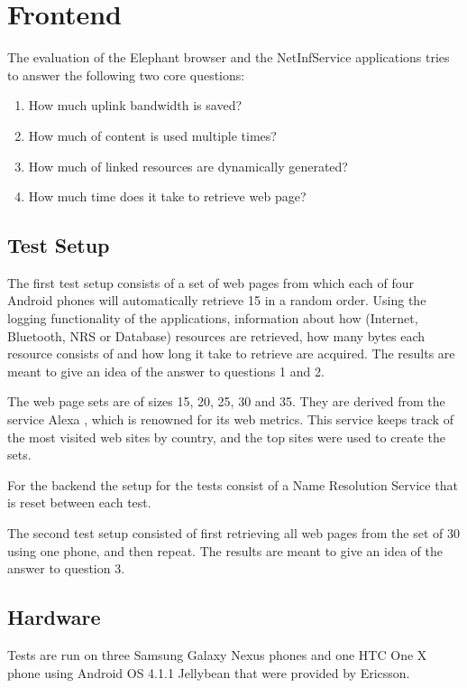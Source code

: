 \section{Frontend}
The evaluation of the Elephant browser and the NetInfService applications tries to answer the following two core questions:

\begin{enumerate}
\item How much uplink bandwidth is saved?
\item How much of content is used multiple times?
\item How much of linked resources are dynamically generated?
\item How much time does it take to retrieve web page?
\end{enumerate}

\subsection{Test Setup}

The first test setup consists of a set of web pages from which each of four Android phones will automatically retrieve 15 in a random order. Using the logging functionality of the applications, information about how (Internet, Bluetooth, NRS or Database) resources are retrieved, how many bytes each resource consists of and how long it take to retrieve are acquired. The results are meant to give an idea of the answer to questions 1 and 2.

The web page sets are of sizes 15, 20, 25, 30 and 35. They are derived from the service Alexa \cite{alexa}, which is renowned for its web metrics. This service keeps track of the most visited web sites by country, and the top sites were used to create the sets.

For the backend the setup for the tests consist of a Name Resolution Service that is reset between each test.

The second test setup consisted of first retrieving all web pages from the set of 30 using one phone, and then repeat. The results are meant to give an idea of the answer to question 3.

\subsection{Hardware}

Tests are run on three Samsung Galaxy Nexus phones and one HTC One X phone using Android OS 4.1.1 Jellybean that were provided by Ericsson.

